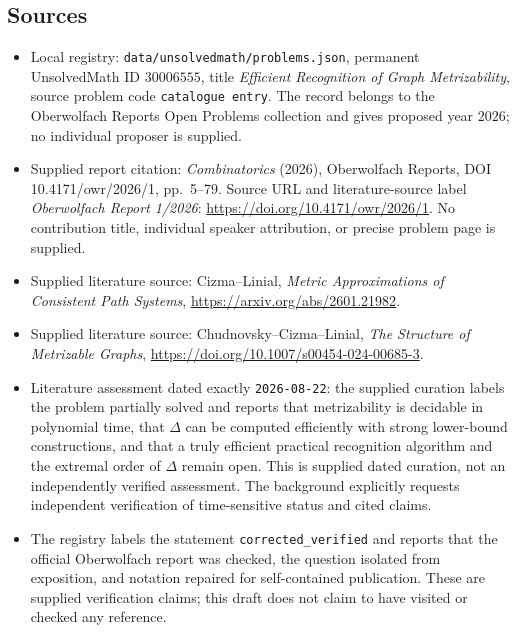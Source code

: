 \documentclass[11pt]{article}
\begin{document}
\subsection{Sources}
\begin{itemize}
\item Local registry: \texttt{data/unsolvedmath/problems.json}, permanent UnsolvedMath ID \(30006555\), title \emph{Efficient Recognition of Graph Metrizability}, source problem code \texttt{catalogue entry}. The record belongs to the Oberwolfach Reports Open Problems collection and gives proposed year \(2026\); no individual proposer is supplied.
\item Supplied report citation: \emph{Combinatorics} (2026), Oberwolfach Reports, DOI 10.4171/owr/2026/1, pp.~5--79. Source URL and literature-source label \emph{Oberwolfach Report 1/2026}: \url{https://doi.org/10.4171/owr/2026/1}. No contribution title, individual speaker attribution, or precise problem page is supplied.
\item Supplied literature source: Cizma--Linial, \emph{Metric Approximations of Consistent Path Systems}, \url{https://arxiv.org/abs/2601.21982}.
\item Supplied literature source: Chudnovsky--Cizma--Linial, \emph{The Structure of Metrizable Graphs}, \url{https://doi.org/10.1007/s00454-024-00685-3}.
\item Literature assessment dated exactly \texttt{2026-08-22}: the supplied curation labels the problem partially solved and reports that metrizability is decidable in polynomial time, that \(\Delta\) can be computed efficiently with strong lower-bound constructions, and that a truly efficient practical recognition algorithm and the extremal order of \(\Delta\) remain open. This is supplied dated curation, not an independently verified assessment. The background explicitly requests independent verification of time-sensitive status and cited claims.
\item The registry labels the statement \texttt{corrected\_verified} and reports that the official Oberwolfach report was checked, the question isolated from exposition, and notation repaired for self-contained publication. These are supplied verification claims; this draft does not claim to have visited or checked any reference.
\end{itemize}
\end{document}
